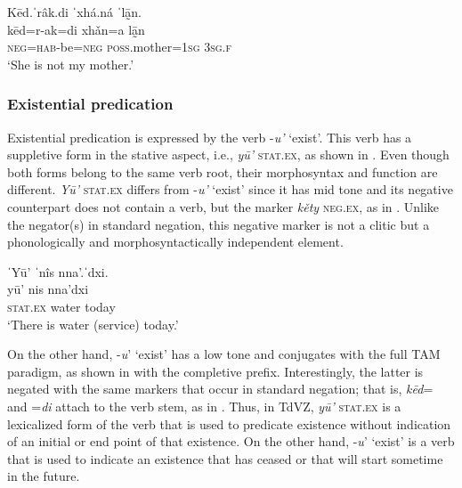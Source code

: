 \documentclass[output=paper,colorlinks=true, citecolor=brown]{langscibook}
\begin{document}
\ea\label{ex:zap:46} 
    \glll Kēd.ˈrâk.di ˈxhá.ná ˈlā̰n.\\ 
           kēd=r-ak=di xhǎn=a lā̰n\\
          \textsc{neg}=\textsc{hab}{}-be=\textsc{neg} \textsc{poss}.mother=\textsc{1sg} \textsc{3sg.f}\\
    \glt  ‘She is not my mother.’
\z 

\subsubsection{Existential predication}\label{sec:zap:2.3.5}
\label{bkm:Ref126504315}
Existential predication is expressed by the verb -\textit{u’} ‘exist’. This verb has a suppletive form in the stative aspect, i.e., \textit{yū’} \textsc{stat.ex}, as shown in . Even though both forms belong to the same verb root, their morphosyntax and function are different. \textit{Yū’} \textsc{stat.ex} differs from {}-\textit{u’} ‘exist’ since it has mid tone and its negative counterpart does not contain a verb, but the marker \textit{kěty} \textsc{neg.ex}, as in . Unlike the negator(s) in standard negation, this negative marker is not a clitic but a phonologically and morphosyntactically independent element.

\ea\label{ex:zap:47} 
    \glll ˈYū’ ˈnîs nna’.ˈdxi.\\ 
          yū’ nis nna’dxi\\
          \textsc{stat.ex} water today\\
    \glt ‘There is water (service) today.’
\z 

On the other hand, -\textit{u}’ ‘exist’ has a low tone and conjugates with the full TAM paradigm, as shown in  with the completive prefix. Interestingly, the latter is negated with the same markers that occur in standard negation; that is, \textit{kēd}= and =\textit{di} attach to the verb stem, as in . Thus, in TdVZ, \textit{yū’} \textsc{stat.ex} is a lexicalized form of the verb that is used to predicate existence without indication of an initial or end point of that existence. On the other hand, {}-\textit{u}’ ‘exist’ is a verb that is used to indicate an existence that has ceased or that will start sometime in the future.
\end{document}
